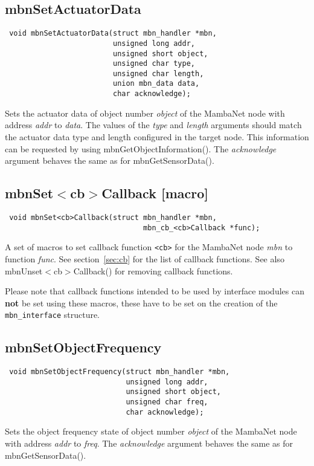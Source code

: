 \documentclass[a4paper]{report}
\begin{document}
\subsection{mbnSetActuatorData}
\begin{verbatim}
 void mbnSetActuatorData(struct mbn_handler *mbn,
                         unsigned long addr,
                         unsigned short object,
                         unsigned char type,
                         unsigned char length,
                         union mbn_data data,
                         char acknowledge);
\end{verbatim}
Sets the actuator data of object number \textit{object} of the MambaNet node with address \textit{addr} to \textit{data}. The values of the \textit{type} and \textit{length} arguments should match the actuator data type and length configured in the target node. This information can be requested by using mbnGetObjectInformation(). The \textit{acknowledge} argument behaves the same as for mbnGetSensorData().


\subsection{mbnSet$<$cb$>$Callback \footnotesize{[macro]}}
\begin{verbatim}
 void mbnSet<cb>Callback(struct mbn_handler *mbn,
                                mbn_cb_<cb>Callback *func);
\end{verbatim}
A set of macros to set callback function \verb|<cb>| for the MambaNet node \textit{mbn} to function \textit{func}. See section\ \ref{sec:cb} for the list of callback functions. See also mbnUnset$<$cb$>$Callback() for removing callback functions.

Please note that callback functions intended to be used by interface modules can \textbf{not} be set using these macros, these have to be set on the creation of the \verb|mbn_interface| structure.


\subsection{mbnSetObjectFrequency}
\begin{verbatim}
 void mbnSetObjectFrequency(struct mbn_handler *mbn,
                            unsigned long addr,
                            unsigned short object,
                            unsigned char freq,
                            char acknowledge);
\end{verbatim}
Sets the object frequency state of object number \textit{object} of the MambaNet node with address \textit{addr} to \textit{freq}. The \textit{acknowledge} argument behaves the same as for mbnGetSensorData().
\end{document}
